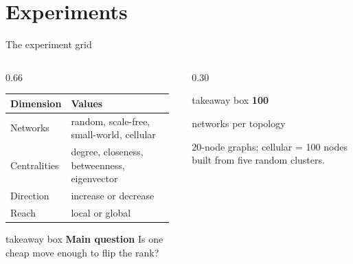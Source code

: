 \section{Experiments}

\begin{frame}{The experiment grid}
  \begin{columns}[T,onlytextwidth]
    \begin{column}{0.66\textwidth}
      \small
      \begin{tabular}{@{}p{0.30\linewidth}p{0.65\linewidth}@{}}
        \toprule
        \textbf{Dimension} & \textbf{Values} \\
        \midrule
        Networks      & random, scale-free, small-world, cellular \\
        \addlinespace[2pt]
        Centralities  & degree, closeness, betweenness, eigenvector \\
        \addlinespace[2pt]
        Direction     & increase or decrease \\
        \addlinespace[2pt]
        Reach         & local or global \\
        \bottomrule
      \end{tabular}
      \vspace{0.6em}

      \begin{beamercolorbox}[wd=\linewidth,rounded=true,sep=0.55em]{takeaway box}
        {\color{PresFourAccent}\bfseries Main question}\quad
        Is one cheap move enough to flip the rank?
      \end{beamercolorbox}
    \end{column}
    \begin{column}{0.30\textwidth}
      \centering
      \begin{beamercolorbox}[wd=\linewidth,rounded=true,sep=0.95em]{takeaway box}
        {\color{PresFourAdversary}\bfseries 100}\par
        {\small networks per topology}\par
        \vspace{0.30em}
        {\scriptsize\color{PresFourMuted}20-node graphs; cellular = 100 nodes built from five random clusters.}
      \end{beamercolorbox}
    \end{column}
  \end{columns}
\end{frame}

